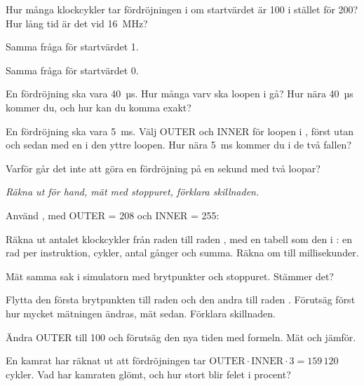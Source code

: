 \label{c9:ex:7}
\begin{parts}
  \item Hur många klockcykler tar fördröjningen i  om startvärdet är 100 i stället
    för 200? Hur lång tid är det vid 16~MHz?
  \item Samma fråga för startvärdet 1.
  \item Samma fråga för startvärdet 0.
\end{parts}

\label{c9:ex:8}
\begin{parts}
  \item En fördröjning ska vara 40~µs. Hur många varv ska loopen i  gå? Hur nära
    40~µs kommer du, och hur kan du komma exakt?
  \item En fördröjning ska vara 5~ms. Välj OUTER och INNER för loopen i , först utan
    och sedan med en  i den yttre loopen. Hur nära 5~ms kommer du i de två fallen?
  \item Varför går det inte att göra en fördröjning på en sekund med två loopar?
\end{parts}

\label{c9:ex:9}
\emph{Räkna ut för hand, mät med stoppuret, förklara skillnaden.}

Använd , med OUTER = 208 och INNER = 255:


\begin{parts}
  \item Räkna ut antalet klockcykler från raden  till raden ,
    med en tabell som den i : en rad per instruktion, cykler, antal gånger och
    summa. Räkna om till millisekunder.
  \item Mät samma sak i simulatorn med brytpunkter och stoppuret. Stämmer det?
  \item Flytta den första brytpunkten till raden  och den andra till raden
    . Förutsäg först hur mycket mätningen ändras, mät sedan. Förklara
    skillnaden.
  \item Ändra OUTER till 100 och förutsäg den nya tiden med formeln. Mät och jämför.
  \item En kamrat har räknat ut att fördröjningen tar $\text{OUTER} \cdot \text{INNER} \cdot 3 =
    159\,120$ cykler. Vad har kamraten glömt, och hur stort blir felet i procent?
\end{parts}

